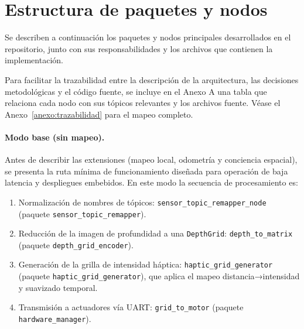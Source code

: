 \section{Estructura de paquetes y nodos}
Se describen a continuación los paquetes y nodos principales desarrollados en el repositorio, junto con sus responsabilidades y los archivos que contienen la implementación.

Para facilitar la trazabilidad entre la descripción de la arquitectura, las decisiones metodológicas y el código fuente, se incluye en el Anexo A una tabla que relaciona cada nodo con sus tópicos relevantes y los archivos fuente. Véase el Anexo~\ref{anexo:trazabilidad} para el mapeo completo.


\paragraph{Modo base (sin mapeo).}
Antes de describir las extensiones (mapeo local, odometría y conciencia espacial), se presenta la ruta mínima de funcionamiento diseñada para operación de baja latencia y despliegues embebidos. En este modo la secuencia de procesamiento es:

\begin{enumerate}
  \item Normalización de nombres de tópicos: \texttt{sensor\_topic\_remapper\_node} (paquete \texttt{sensor\_topic\_remapper}).
  \item Reducción de la imagen de profundidad a una \texttt{DepthGrid}: \texttt{depth\_to\_matrix} (paquete \texttt{depth\_grid\_encoder}).
  \item Generación de la grilla de intensidad háptica: \texttt{haptic\_grid\_generator} (paquete \texttt{haptic\_grid\_generator}), que aplica el mapeo distancia→intensidad y suavizado temporal.
  \item Transmisión a actuadores vía UART: \texttt{grid\_to\_motor} (paquete \texttt{hardware\_manager}).
\end{enumerate}

